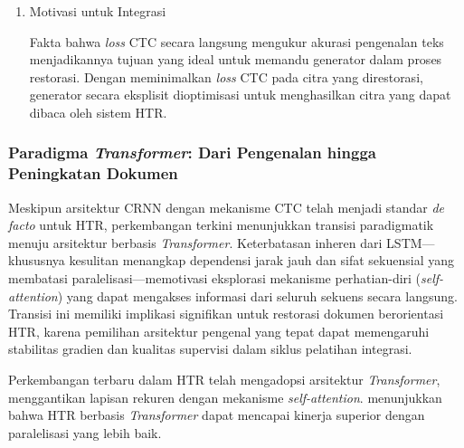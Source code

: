\begin{enumerate}[leftmargin=*, labelindent=0pt, itemsep=1ex, topsep=0pt]
\begin{enumerate}[leftmargin=1.5em, labelsep=0.5em, itemindent=0pt, label=\alph*., topsep=0pt, parsep=0pt, itemsep=0pt]
      \item Propagasi Kesalahan dalam Lapisan Rekuren \mbox{}\\[0.1em]
            Lapisan LSTM meneruskan informasi lintas langkah waktu. Kesalahan atau ketidakpastian di langkah waktu awal dapat bertambah dan memengaruhi prediksi selanjutnya. Restorasi yang meningkatkan pengenalan karakter awal akan memiliki manfaat yang berantai.
\end{enumerate}

\item Motivasi untuk Integrasi

Fakta bahwa \textit{loss} CTC secara langsung mengukur akurasi pengenalan teks menjadikannya tujuan yang ideal untuk memandu generator dalam proses restorasi. Dengan meminimalkan \textit{loss} CTC pada citra yang direstorasi, generator secara eksplisit dioptimisasi untuk menghasilkan citra yang dapat dibaca oleh sistem HTR.

\end{enumerate}

\subsubsection{Paradigma \textit{Transformer}: Dari Pengenalan hingga Peningkatan Dokumen}
\label{subsubsec:transformer-htr}


Meskipun arsitektur CRNN dengan mekanisme CTC telah menjadi standar \textit{de facto} untuk HTR, perkembangan terkini menunjukkan transisi paradigmatik menuju arsitektur berbasis \textit{Transformer}. Keterbatasan inheren dari LSTM—khususnya kesulitan menangkap dependensi jarak jauh dan sifat sekuensial yang membatasi paralelisasi—memotivasi eksplorasi mekanisme perhatian-diri (\textit{self-attention}) yang dapat mengakses informasi dari seluruh sekuens secara langsung. Transisi ini memiliki implikasi signifikan untuk restorasi dokumen berorientasi HTR, karena pemilihan arsitektur pengenal yang tepat dapat memengaruhi stabilitas gradien dan kualitas supervisi dalam siklus pelatihan integrasi.

Perkembangan terbaru dalam HTR telah mengadopsi arsitektur \textit{Transformer}, menggantikan lapisan rekuren dengan mekanisme \textit{self-attention}. \parencite{diaz2021} menunjukkan bahwa HTR berbasis \textit{Transformer} dapat mencapai kinerja superior dengan paralelisasi yang lebih baik.

